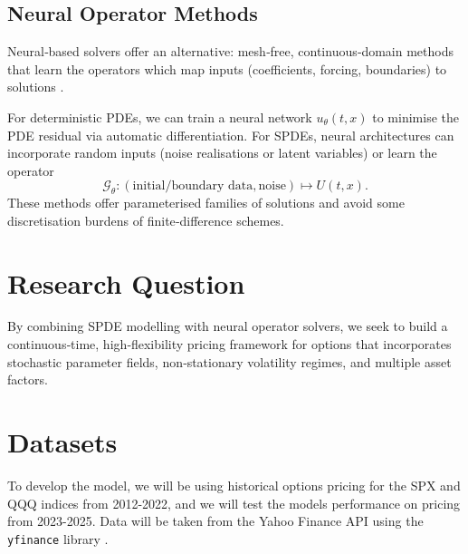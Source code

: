\documentclass{article}
\begin{document}
\subsection{Neural Operator Methods}
Neural‐based solvers offer an alternative: mesh‐free, continuous‐domain methods that learn the operators which map inputs (coefficients, forcing, boundaries) to solutions \citep{shen2025neuralsdesunifiedapproach}.

For deterministic PDEs, we can train a neural network \(u_\theta(t,x)\) to minimise the PDE residual via automatic differentiation. For SPDEs, neural architectures can incorporate random inputs (noise realisations or latent variables) or learn the operator \citep{salvi2022neuralstochasticpdesresolutioninvariant}
\[
    \mathcal G_\theta: (\text{initial/boundary data}, \text{noise}) \mapsto U(t,x).
\]
These methods offer parameterised families of solutions and avoid some discretisation burdens of finite‐difference schemes.

\section{Research Question}
By combining SPDE modelling with neural operator solvers, we seek to build a continuous‐time, high‐flexibility pricing framework for options that incorporates stochastic parameter fields, non‐stationary volatility regimes, and multiple asset factors.

\section{Datasets}
To develop the model, we will be using historical options pricing for the SPX and QQQ indices from 2012-2022, and we will test the models performance on pricing from 2023-2025. Data will be taken from the Yahoo Finance API using the \texttt{yfinance} library \citep{aroussi_nodate_yfinance}.





\end{document}
